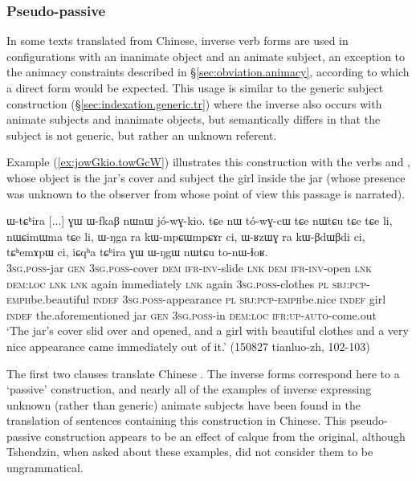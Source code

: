\subsubsection{Pseudo-passive} \label{sec:pseudo.passive}
In some texts translated from Chinese, inverse verb forms are used in configurations with an inanimate object and an animate subject, an exception to the animacy constraints described in §\ref{sec:obviation.animacy}, according to which a direct form would be expected. This usage is similar to the generic subject construction (§\ref{sec:indexation.generic.tr}) where the inverse also occurs with animate subjects and inanimate objects, but semantically differs in that the subject is not generic, but rather an unknown referent. 

Example (\ref{ex:jowGkio.towGcW}) illustrates this construction with the verbs  and , whose object is the jar's cover and subject the girl inside the jar (whose presence was unknown to the observer from whose point of view this passage is narrated). 

\begin{exe}
\ex \label{ex:jowGkio.towGcW}
\gll ɯ-tɕʰira [...] ɣɯ ɯ-fkaβ nɯnɯ jó-wɣ-kio. tɕe nɯ tó-wɣ-cɯ tɕe nɯtɕu tɕe tɕe li, nɯɕimɯma tɕe li,  ɯ-ŋga ra kɯ-mpɕɯ\redp{}mpɕɤr ci, ɯ-ʁzɯɣ ra kɯ-βdɯ\redp{}βdi ci, tɕʰemɤpɯ ci, iɕqʰa tɕʰira ɣɯ ɯ-ŋgɯ nɯtɕu to-nɯ-ɬoʁ.\\
\textsc{3sg}.\textsc{poss}-jar { } \textsc{gen} \textsc{3sg}.\textsc{poss}-cover \textsc{dem} \textsc{ifr}-\textsc{inv}-slide \textsc{lnk} \textsc{dem} \textsc{ifr}-\textsc{inv}-open \textsc{lnk} \textsc{dem}:\textsc{loc} \textsc{lnk} \textsc{lnk} again immediately \textsc{lnk} again \textsc{3sg}.\textsc{poss}-clothes \textsc{pl} \textsc{sbj}:\textsc{pcp}-\textsc{emph}\redp{}be.beautiful \textsc{indef} \textsc{3sg}.\textsc{poss}-appearance \textsc{pl} \textsc{sbj}:\textsc{pcp}-\textsc{emph}\redp{}be.nice  \textsc{indef} girl \textsc{indef} the.aforementioned jar \textsc{gen} \textsc{3sg}.\textsc{poss}-in \textsc{dem}:\textsc{loc} \textsc{ifr}:\textsc{up}-\textsc{auto}-come.out \\
\glt `The jar's cover slid over and opened, and a girl with beautiful clothes and a very nice appearance came immediately out of it.' (150827 tianluo-zh, 102-103)
\end{exe}

The first two clauses translate Chinese . The inverse forms correspond here to a   `passive' construction, and nearly all of the examples of inverse expressing unknown (rather than generic) animate subjects have been found in the translation of sentences containing this construction in Chinese. This pseudo-passive construction appears to be an effect of calque from the original, although Tshendzin, when asked about these examples, did not consider them to be ungrammatical. 

